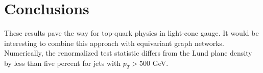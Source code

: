 \section{Conclusions}\label{sec:conclusions}

These results pave the way for top-quark physics in light-cone gauge. It
would be interesting to combine this approach with equivariant graph
networks. Numerically, the renormalized test statistic differs from the
Lund plane density by less than five percent for jets with $p_T > 500$
GeV.

